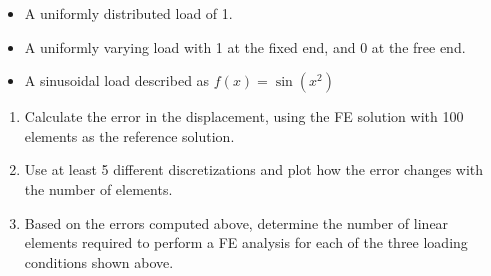 \documentclass[a4paper,12pt]{article}
\begin{document}
\begin{enumerate}
		\begin{itemize}
			\item A uniformly distributed load of 1.
			\item A uniformly varying load with 1 at the fixed end, and 0 at the free end.
			\item A sinusoidal load described as $f(x) = \sin(x^2)$
		\end{itemize}
	
		\begin{enumerate}
			\item Calculate the error in the displacement, using the FE solution with 100 elements as the reference solution.
			\item Use at least 5 different discretizations and plot how the error changes with the number of elements.
			\item Based on the errors computed above, determine the number of linear elements required to perform a FE analysis for each of the three loading conditions shown above.
		\end{enumerate}
	
\end{enumerate}
\end{document}
